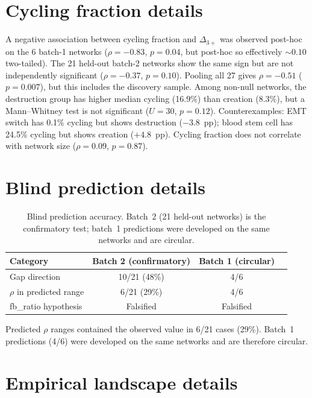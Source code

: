 \documentclass[10pt]{article}
\begin{document}
\section{Cycling fraction details}
\label{supp:cycling}

A negative association between cycling fraction and $\Delta_{3+}$
was observed post-hoc on the 6 batch-1 networks ($\rho = -0.83$,
$p = 0.04$, but post-hoc so effectively $\sim 0.10$ two-tailed).
The 21 held-out batch-2 networks show the same sign but are not
independently significant ($\rho = -0.37$, $p = 0.10$). Pooling
all 27 gives $\rho = -0.51$ ($p = 0.007$), but this includes the
discovery sample. Among non-null networks, the destruction group
has higher median cycling (16.9\%) than creation (8.3\%), but a
Mann--Whitney test is not significant ($U = 30$, $p = 0.12$).
Counterexamples: EMT switch has 0.1\% cycling but shows destruction
($-3.8$~pp); blood stem cell has 24.5\% cycling but shows creation
($+4.8$~pp). Cycling fraction does not correlate with network size
($\rho = 0.09$, $p = 0.87$).


\section{Blind prediction details}
\label{supp:blind}

\begin{table}[h]
\centering
\caption{Blind prediction accuracy. Batch~2 (21 held-out networks) is
the confirmatory test; batch~1 predictions were developed on the same
networks and are circular.}
\begin{tabular}{lccc}
\toprule
Category & Batch 2 (confirmatory) & Batch 1 (circular) \\
\midrule
Gap direction & 10/21 (48\%) & 4/6 \\
$\rho$ in predicted range & 6/21 (29\%) & 4/6 \\
fb\_ratio hypothesis & Falsified & Falsified \\
\bottomrule
\end{tabular}
\end{table}

Predicted $\rho$ ranges contained the observed value in 6/21 cases
(29\%). Batch~1 predictions (4/6) were developed on the same networks
and are therefore circular.


\section{Empirical landscape details}
\label{supp:empirical}
\end{document}
